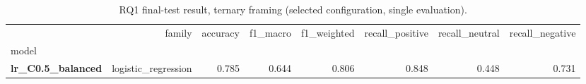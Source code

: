 \begin{table}
\caption{RQ1 final-test result, ternary framing (selected configuration, single evaluation).}
\label{tab:rq1_ternary}
\begin{tabular}{lrrrrrrr}
\toprule
 & family & accuracy & f1_macro & f1_weighted & recall_positive & recall_neutral & recall_negative \\
model &  &  &  &  &  &  &  \\
\midrule
\textbf{lr_C0.5_balanced} & logistic_regression & 0.785 & 0.644 & 0.806 & 0.848 & 0.448 & 0.731 \\
\bottomrule
\end{tabular}
\end{table}

